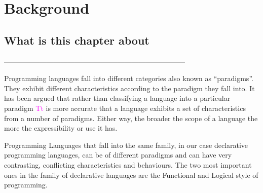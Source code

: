 \documentclass[thesis-solanki.tex]{subfiles}
\begin{document}
\chapter{Background}\label{chap:background}

\section{What is this chapter about}

-----------------------------------------------------------------------------

Programming languages fall into different categories also known as ``paradigms''.
They exhibit different characteristics according to the paradigm they fall into.
It has been argued \cite{Krishnamurthi:2008:TPL:1480828.1480846} that
rather than classifying a language into a particular paradigm
\textcolor{fuchsia}{Tt} is
more accurate that a language exhibits a set of characteristics from a
number of paradigms.
Either way, the broader the scope of a language the more the
expressibility or use it has.

Programming Languages that fall into the same family, in our case declarative programming languages, can be of
different paradigms and can have very contrasting, conflicting characteristics and behaviours.
The two most important ones in the family of declarative languages are the Functional and Logical style of
programming.
\end{document}
